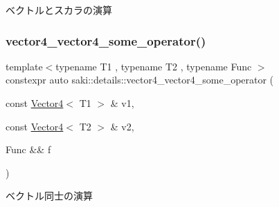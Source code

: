 ベクトルとスカラの演算 

\mbox{\label{namespacesaki_1_1details_a7faa5e95c73949e48acc6840c357990f}} 
\subsubsection{\texorpdfstring{vector4\+\_\+vector4\+\_\+some\+\_\+operator()}{vector4\_vector4\_some\_operator()}}
{\footnotesize\ttfamily template$<$typename T1 , typename T2 , typename Func $>$ \\
constexpr auto saki\+::details\+::vector4\+\_\+vector4\+\_\+some\+\_\+operator (\begin{DoxyParamCaption}\item[{const \mbox{\hyperlink{classsaki_1_1_vector4}{Vector4}}$<$ T1 $>$ \&}]{v1,  }\item[{const \mbox{\hyperlink{classsaki_1_1_vector4}{Vector4}}$<$ T2 $>$ \&}]{v2,  }\item[{Func \&\&}]{f }\end{DoxyParamCaption})}



ベクトル同士の演算 

